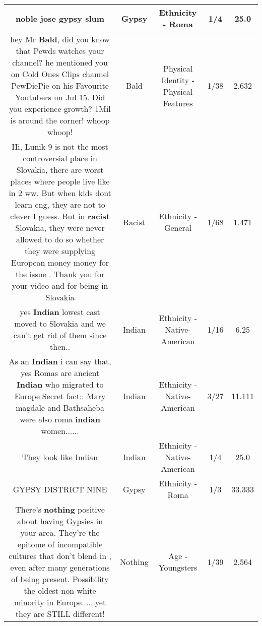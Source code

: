 \documentclass[11pt]{article}
\newlength\mylength
\begin{document}
\begin{center}
\begin{longtable}{|C{.65\mylength}|C{.30\mylength}|C{.12\mylength}|C{.12\mylength}|C{.12\mylength}|}
  \small noble jose \textbf{gypsy} slum\normalsize   & Gypsy & Ethnicity - Roma & 1/4 & 25.0 \\  \hline
  \small hey Mr \textbf{Bald}, did you know that Pewds watches your channel?  he mentioned you on Cold Ones Clips channel PewDiePie on his Favourite Youtubers un Jul 15. Did you experience growth? 1Mil is around the corner! whoop whoop!\normalsize   & Bald & Physical Identity - Physical Features & 1/38 & 2.632 \\  \hline
  \small Hi, Lunik 9 is not the most controversial place in Slovakia, there are worst places where people live like in 2 ww. But when kids dont learn eng, they are not to clever I guess. But in \textbf{racist} Slovakia, they were never allowed to do so whether they were supplying European money  money for the issue . Thank you for your video and for being in Slovakia\normalsize   & Racist & Ethnicity - General & 1/68 & 1.471 \\  \hline
  \small yes \textbf{Indian} lowest cast moved to Slovakia and we can't get rid of them since then..\normalsize   & Indian & Ethnicity - Native-American & 1/16 & 6.25 \\  \hline
  \small As an \textbf{Indian} i can say that, yes Romas are ancient \textbf{Indian} who migrated to Europe.Secret fact:: Mary magdale and Bathsaheba were also roma \textbf{indian} women......\normalsize   & Indian & Ethnicity - Native-American & 3/27 & 11.111 \\  \hline
  \small They look like Indian\normalsize   & Indian & Ethnicity - Native-American & 1/4 & 25.0 \\  \hline
  \small GYPSY DISTRICT NINE\normalsize   & Gypsy & Ethnicity - Roma & 1/3 & 33.333 \\  \hline
  \small There's \textbf{nothing} positive about having Gypsies in your area. They're  the epitome of incompatible cultures that don't blend in , even after  many generations of being present. Possibility the oldest non white minority in Europe......yet they are STILL different!\normalsize   & Nothing & Age - Youngsters & 1/39 & 2.564 \\  \hline

\end{longtable}
\end{center}
\end{document}

